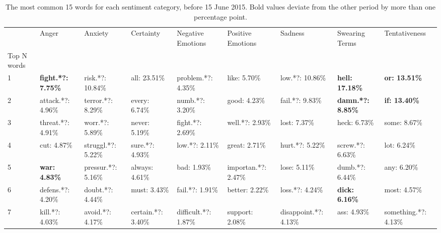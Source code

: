 \begin{table}[h]\centering
\caption{The most common 15 words for each sentiment category, before 15 June 2015. Bold values deviate from the other period by more than one percentage point.}
	\label{fig: before_1}
\begin{adjustbox}{width=\linewidth, center}
	\begin{tabular}{lllllllll}
	\toprule
	{} &                      Anger &               Anxiety &              Certainty &     Negative Emotions &    Positive Emotions &                Sadness &            Swearing Terms &         Tentativeness \\
	Top N words          &                            &                       &                        &                       &                      &                        &                           &                       \\
	\midrule
	1                    &  \textbf{fight.*?: 7.75\%} &      risk.*?: 10.84\% &           all: 23.51\% &    problem.*?: 4.35\% &         like: 5.70\% &        low.*?: 10.86\% &    \textbf{hell: 17.18\%} &  \textbf{or: 13.51\%} \\
	2                    &          attack.*?: 4.96\% &     terror.*?: 8.29\% &          every: 6.74\% &       numb.*?: 3.20\% &         good: 4.23\% &        fail.*?: 9.83\% &  \textbf{damn.*?: 8.85\%} &  \textbf{if: 13.40\%} \\
	3                    &          threat.*?: 4.91\% &       worr.*?: 5.89\% &          never: 5.19\% &      fight.*?: 2.69\% &      well.*?: 2.93\% &           lost: 7.37\% &              heck: 6.73\% &          some: 8.67\% \\
	4                    &                cut: 4.87\% &    struggl.*?: 5.22\% &        sure.*?: 4.93\% &        low.*?: 2.11\% &        great: 2.71\% &        hurt.*?: 5.22\% &          screw.*?: 6.63\% &           lot: 6.24\% \\
	5                    &       \textbf{war: 4.83\%} &    pressur.*?: 5.16\% &         always: 4.61\% &           bad: 1.93\% &  importan.*?: 2.47\% &           lose: 5.11\% &           dumb.*?: 6.44\% &           any: 6.20\% \\
	6                    &          defens.*?: 4.20\% &      doubt.*?: 4.44\% &           must: 3.43\% &       fail.*?: 1.91\% &       better: 2.22\% &        loss.*?: 4.24\% &     \textbf{dick: 6.16\%} &          most: 4.57\% \\
	7                    &            kill.*?: 4.03\% &      avoid.*?: 4.17\% &     certain.*?: 3.40\% &  difficult.*?: 1.87\% &      support: 2.08\% &  disappoint.*?: 4.13\% &               ass: 4.93\% &  something.*?: 4.13\% \\

\end{tabular}
\end{adjustbox}
\end{table}
